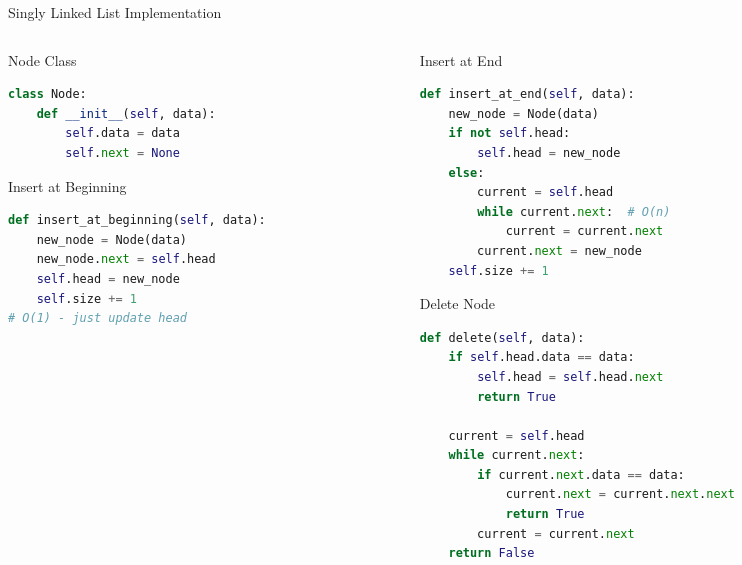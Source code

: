 \documentclass[aspectratio=169,xcolor=dvipsnames]{beamer}
\begin{document}
\begin{frame}[fragile]{Singly Linked List Implementation}
  \begin{columns}
    \begin{column}{0.48\textwidth}
      \begin{exampleblock}{Node Class}
        \begin{lstlisting}[language=Python,basicstyle=\tiny\ttfamily]
class Node:
    def __init__(self, data):
        self.data = data
        self.next = None
        \end{lstlisting}
      \end{exampleblock}

      \begin{exampleblock}{Insert at Beginning}
        \begin{lstlisting}[language=Python,basicstyle=\tiny\ttfamily]
def insert_at_beginning(self, data):
    new_node = Node(data)
    new_node.next = self.head
    self.head = new_node
    self.size += 1
# O(1) - just update head
        \end{lstlisting}
      \end{exampleblock}
    \end{column}
    \begin{column}{0.48\textwidth}
      \begin{exampleblock}{Insert at End}
        \begin{lstlisting}[language=Python,basicstyle=\tiny\ttfamily]
def insert_at_end(self, data):
    new_node = Node(data)
    if not self.head:
        self.head = new_node
    else:
        current = self.head
        while current.next:  # O(n)
            current = current.next
        current.next = new_node
    self.size += 1
        \end{lstlisting}
      \end{exampleblock}

      \begin{exampleblock}{Delete Node}
        \begin{lstlisting}[language=Python,basicstyle=\tiny\ttfamily]
def delete(self, data):
    if self.head.data == data:
        self.head = self.head.next
        return True

    current = self.head
    while current.next:
        if current.next.data == data:
            current.next = current.next.next
            return True
        current = current.next
    return False
        \end{lstlisting}
      \end{exampleblock}
    \end{column}
  \end{columns}
\end{frame}
\end{document}

